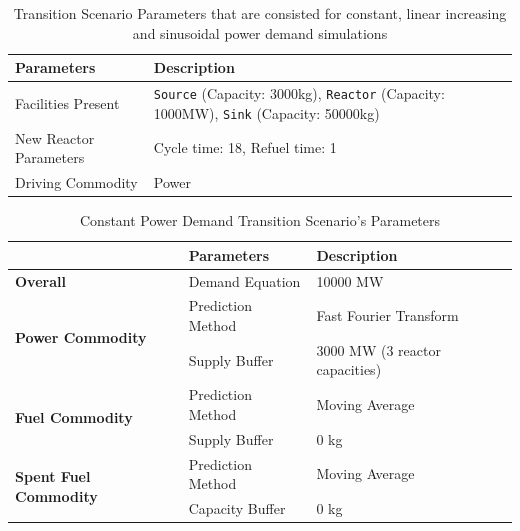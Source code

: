 \documentclass{anstrans}
\begin{document}
\begin{table}[!htb]
    \centering
    \caption {Transition Scenario Parameters that are consisted for constant, linear increasing and sinusoidal power demand simulations}
	\label{tab:transition-scenario-all}
    \begin{tabular}{|l|p{4.5cm}|}
    \hline
    \textbf{Parameters}    & \textbf{Description} \\ \hline
    Facilities Present     & \texttt{Source} (Capacity: 3000kg), \texttt{Reactor} (Capacity: 1000MW), \texttt{Sink} (Capacity: 50000kg)      \\ \hline
    New Reactor Parameters & Cycle time: 18, Refuel time: 1\\ \hline
    Driving Commodity & Power \\ \hline
    \end{tabular}
\end{table}

\begin{table}[!htb]
    \centering
    \caption {Constant Power Demand Transition Scenario's Parameters}
	\label{tab:transition-scenario-constant-power}
    \begin{tabular}{|l|l|p{4.5cm}|}
    \hline
                                     & \textbf{Parameters}    & \textbf{Description} \\ \hline
    \textbf{Overall}& Demand Equation & 10000 MW \\ \hline
    \multirow{2}{*}{\textbf{Power Commodity}} & Prediction Method      &  Fast Fourier Transform\\ \cline{2-3} 
                                     & Supply Buffer          &  3000 MW (3 reactor capacities)\\ \hline
    \multirow{2}{*}{\textbf{Fuel Commodity}}  & Prediction Method      &  Moving Average\\ \cline{2-3}
                                     & Supply Buffer & 0 kg \\ \hline
    \multirow{2}{*}{\textbf{Spent Fuel Commodity}}  & Prediction Method      &  Moving Average\\ \cline{2-3}
                                     & Capacity Buffer & 0 kg \\ \hline
    \end{tabular}
\end{table}
\end{document}

